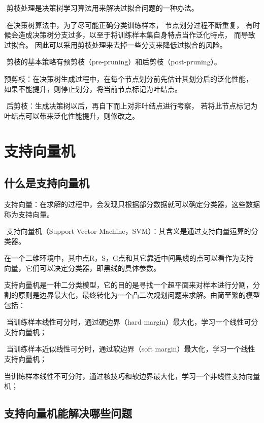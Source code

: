 ​ 剪枝处理是决策树学习算法用来解决过拟合问题的一种办法。

​ 在决策树算法中，为了尽可能正确分类训练样本， 节点划分过程不断重复，
有时候会造成决策树分支过多，以至于将训练样本集自身特点当作泛化特点，
而导致过拟合。 因此可以采用剪枝处理来去掉一些分支来降低过拟合的风险。

​ 剪枝的基本策略有预剪枝（pre-pruning）和后剪枝（post-pruning）。

​ 预剪枝：在决策树生成过程中，在每个节点划分前先估计其划分后的泛化性能，
如果不能提升，则停止划分，将当前节点标记为叶结点。

​ 后剪枝：生成决策树以后，再自下而上对非叶结点进行考察，
若将此节点标记为叶结点可以带来泛化性能提升，则修改之。

\section{ 支持向量机}\label{ux652fux6301ux5411ux91cfux673a}

\subsection{什么是支持向量机}\label{ux4ec0ux4e48ux662fux652fux6301ux5411ux91cfux673a}

​
支持向量：在求解的过程中，会发现只根据部分数据就可以确定分类器，这些数据称为支持向量。

​ 支持向量机（Support Vector
Machine，SVM）：其含义是通过支持向量运算的分类器。

​
在一个二维环境中，其中点R，S，G点和其它靠近中间黑线的点可以看作为支持向量，它们可以决定分类器，即黑线的具体参数。

 

​
支持向量机是一种二分类模型，它的目的是寻找一个超平面来对样本进行分割，分割的原则是边界最大化，最终转化为一个凸二次规划问题来求解。由简至繁的模型包括：

​ 当训练样本线性可分时，通过硬边界（hard
margin）最大化，学习一个线性可分支持向量机；

​ 当训练样本近似线性可分时，通过软边界（soft
margin）最大化，学习一个线性支持向量机；

​
当训练样本线性不可分时，通过核技巧和软边界最大化，学习一个非线性支持向量机；

\subsection{支持向量机能解决哪些问题}\label{ux652fux6301ux5411ux91cfux673aux80fdux89e3ux51b3ux54eaux4e9bux95eeux9898}

